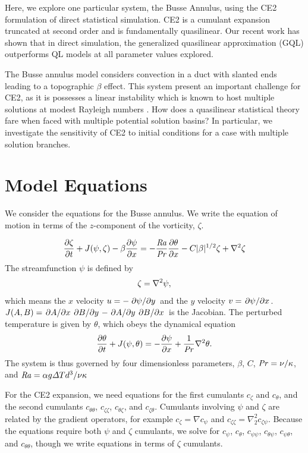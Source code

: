 \documentclass{jfm}
\newcommand{\cz}{c_{\zeta}}
\newcommand{\cs}{c_{\psi}}
\newcommand{\ct}{c_{\theta}}
\newcommand{\css}{c_{\psi \psi}}
\newcommand{\czs}{c_{\zeta \psi}}
\newcommand{\czz}{c_{\zeta \zeta}}
\newcommand{\ctz}{c_{\theta \zeta}}
\newcommand{\czt}{c_{\zeta \theta}}
\newcommand{\ctt}{c_{\theta \theta}}
\newcommand{\cst}{c_{\psi \theta}}
\newcommand{\cts}{c_{\theta \psi}}
\newcommand{\Rayleigh}{\mbox{\textit{Ra}}}  %
\begin{document}
Here, we explore one particular system, the Busse Annulus, using the CE2 formulation of direct statistical simulation.
CE2 is a cumulant expansion truncated at second order and is fundamentally quasilinear.
Our recent work \citep{2018RSPSA.47480422T} has shown that in direct simulation, the generalized quasilinear approximation (GQL) outperforms QL models at all parameter values explored.

The Busse annulus model considers convection in a duct with slanted ends leading to a topographic $\beta$ effect.
This system present an important challenge for CE2, as it is possesses a linear instability which is known to host multiple solutions at modest Rayleigh numbers \citep{1993GApFD..68...85B}.
How does a quasilinear statistical theory fare when faced with multiple potential solution basins?
In particular, we investigate the sensitivity of CE2 to initial conditions for a case with multiple solution branches.

\section{Model Equations}
\label{sec:model-eqations}

We consider the equations for the Busse annulus.
We write the equation of motion in terms of the $z$-component of the vorticity, $\zeta$.

\begin{equation}
  \label{eq:zeta_eom}
  \pdv{\zeta}{t} + J(\psi, \zeta) - \beta \pdv{\psi}{x} = -\frac{\Rayleigh}{\Pran} \pdv{\theta}{x} -C |\beta|^{1/2} \zeta + \laplacian{\zeta}
\end{equation}
The streamfunction $\psi$ is defined by
\begin{equation}
  \label{eq:zeta_def}
  \zeta = \laplacian{\psi},
\end{equation}
which means the $x$ velocity $u = -\pdv*{\psi}{y}$ and the $y$ velocity $v = \pdv*{\psi}{x}$. $J(A, B) = \pdv*{A}{x}\pdv*{B}{y} - \pdv*{A}{y}\pdv*{B}{x}$ is the Jacobian. 
The perturbed temperature is given by $\theta$, which obeys the dynamical equation
%
\begin{equation}
  \label{eq:theta}
  \pdv{\theta}{t} + J(\psi, \theta) = -\pdv{\psi}{x} + \frac{1}{\mbox{\textit{Pr}}} \nabla^2 \theta.
\end{equation}
The system is thus governed by four dimensionless parameters, $\beta$, $C$, $\mbox{\textit{Pr}} = \nu/
\kappa$, and $\Rayleigh = \alpha g \Delta T d^3/\nu \kappa$

For the CE2 expansion, we need equations for the first cumulants $\cz$ and $\ct$, and the second cumulants $\ctt$, $\czz$, $\ctz$, and $\czt$. 
Cumulants involving $\psi$ and $\zeta$ are related by the gradient operators, for example $\cz = \nabla \cs$ and $\czz = \nabla_2^2 \czs$.
Because the equations require both $\psi$ and $\zeta$ cumulants, we solve for $\cs$, $\ct$, $\css$, $\cts$, $\cst$, and $\ctt$, though we write equations in terms of $\zeta$ cumulants.
\end{document}
